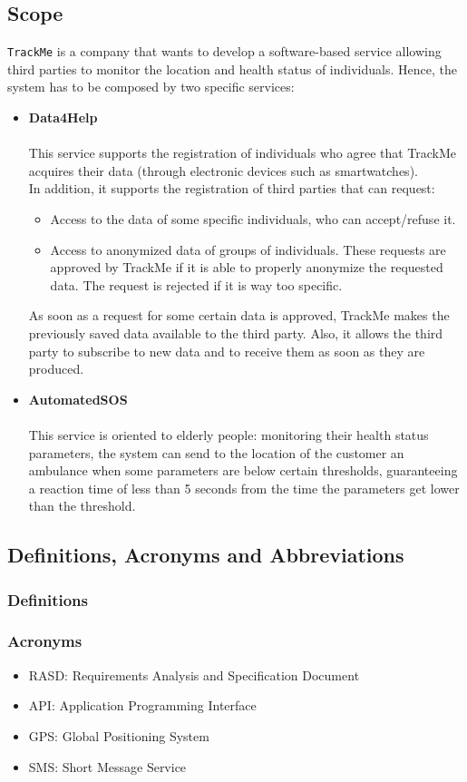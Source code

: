 \documentclass[12pt,a4paper]{article}
\begin{document}
		\subsection{Scope}
		\texttt{TrackMe} is a company that wants to develop a software-based service allowing third parties to monitor the location and health status of individuals.
		Hence, the system has to be composed by two specific services:
		\begin{itemize}
			\item \textbf{Data4Help}\\\\This service supports the registration of individuals who agree that TrackMe acquires their data (through electronic devices such as smartwatches). \\In addition, it supports the registration of third parties that can request:
				\begin{itemize}
					\item Access to the data of some specific individuals, who can accept/refuse it.
					\item Access to anonymized data of groups of individuals. These requests are approved by TrackMe if it is able to properly anonymize the requested data. The request is rejected if it is way too specific.
				\end{itemize}
		As soon as a request for some certain data is approved, TrackMe makes the previously saved data available to the third party. Also, it allows the third party to subscribe to new data and to receive them as soon as they are produced.
			\item \textbf{AutomatedSOS}\\\\This service is oriented to elderly people: monitoring their health status parameters, the system can send to the location of the customer an ambulance when some parameters are below certain thresholds, guaranteeing a reaction time of less than 5 seconds from the time the parameters get lower than the threshold.
		\end{itemize} 
	
	
		\subsection{Definitions, Acronyms and Abbreviations}
			\subsubsection{Definitions}
			\subsubsection{Acronyms}
				\begin{itemize}
				\item RASD: Requirements Analysis and Specification Document
				\item API: Application Programming Interface
				\item GPS: Global Positioning System
				\item SMS: Short Message Service 
				\end{itemize}
\end{document}
